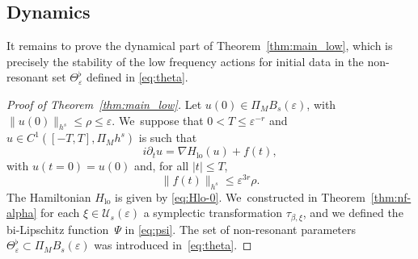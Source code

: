 \documentclass[JEP,XML,SOM,Unicode,published]{cedram}
\theoremstyle{plain}
\theoremstyle{definition}
\DeclareMathOperator{\lo}{lo}
\newcommand{\1}{\mathbf{1}}
\let\epsilon\varepsilon
\begin{document}
\subsection{Dynamics}
\label{sec:dyn-low}
It remains to prove the dynamical part of Theorem~\ref{thm:main_low}, which is precisely the stability of the low frequency actions for initial data in the non-resonant set $\Theta_{\epsilon}^{\flat}$ defined in \eqref{eq:theta}.

\begin{proof}[Proof of Theorem~\ref{thm:main_low}] Let $u(0)\in\Pi_{M}B_{s}(\epsilon)$, with $\|u(0)\|_{h^{s}}\leq \rho \leq \epsilon$. We~suppose that $0<T\leq \epsilon^{-r}$ and $u\in C^{1}([-T,T],\Pi_{M}h^{s})$ is such that
\[
i\partial_{t}u = \nabla H_{\lo}(u) + f(t),
\]
with $u(t=0)=u(0)$ and, for all $|t|\leq T$,
\[
\|f(t)\|_{h^{s}}\leq \epsilon^{3r}\rho.
\]
The Hamiltonian $H_{\lo}$ is given by \eqref{eq:Hlo-0}. We~constructed in Theorem~\ref{thm:nf-alpha} for each $\xi\in\mathcal{U}_{s}(\epsilon)$ a symplectic transformation $\tau_{\beta,\xi}$, and we defined the bi-Lipschitz function~$\Psi$ in \eqref{eq:psi}. The set of non-resonant parameters $\Theta_{\epsilon}^{\flat}\subset \Pi_{M}B_{s}(\epsilon)$ was introduced in~\eqref{eq:theta}.


\end{proof}
\end{document}
